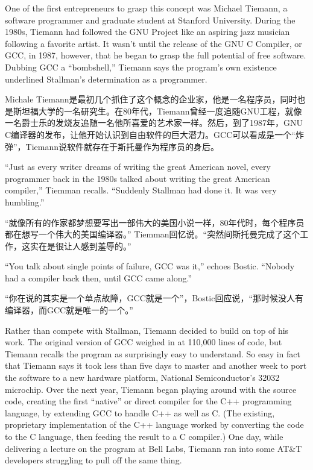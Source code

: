 \ifdefined\eng
One of the first entrepreneurs to grasp this concept was Michael Tiemann, a software programmer and graduate student at Stanford University. During the 1980s, Tiemann had followed the GNU Project like an aspiring jazz musician following a favorite artist. It wasn't until the release of the GNU C Compiler, or GCC, in 1987, however, that he began to grasp the full potential of free software. Dubbing GCC a ``bombshell,'' Tiemann says the program's own existence underlined Stallman's determination as a programmer.
\fi

\ifdefined\chs
Michale Tiemann是最初几个抓住了这个概念的企业家，他是一名程序员，同时也是斯坦福大学的一名研究生。在80年代，Tiemann曾经一度追随GNU工程，就像一名爵士乐的发烧友追随一名他所喜爱的艺术家一样。然后，到了1987年，GNU C编译器的发布，让他开始认识到自由软件的巨大潜力。GCC可以看成是一个“炸弹”，Tiemann说软件就存在于斯托曼作为程序员的身后。
\fi

\ifdefined\eng
``Just as every writer dreams of writing the great American novel, every programmer back in the 1980s talked about writing the great American compiler,'' Tiemman recalls. ``Suddenly Stallman had done it. It was very humbling.''
\fi

\ifdefined\chs
“就像所有的作家都梦想要写出一部伟大的美国小说一样，80年代时，每个程序员都在想写一个伟大的美国编译器。” Tiemman回忆说。“突然间斯托曼完成了这个工作，这实在是很让人感到羞辱的。”
\fi

\ifdefined\eng
``You talk about single points of failure, GCC was it,'' echoes Bostic. ``Nobody had a compiler back then, until GCC came along.''
\fi

\ifdefined\chs
“你在说的其实是一个单点故障，GCC就是一个”，Bostic回应说，“那时候没人有编译器，而GCC就是唯一的一个。”
\fi

\ifdefined\eng
Rather than compete with Stallman, Tiemann decided to build on top of his work. The original version of GCC weighed in at 110,000 lines of code, but Tiemann recalls the program as surprisingly easy to understand. So easy in fact that Tiemann says it took less than five days to master and another week to port the software to a new hardware platform, National Semiconductor's 32032 microchip. Over the next year, Tiemann began playing around with the source code, creating the first ``native'' or direct compiler for the C++ programming language, by extending GCC to handle C++ as well as C. (The existing, proprietary implementation of the C++ language worked by converting the code to the C language, then feeding the result to a C compiler.) One day, while delivering a lecture on the program at Bell Labs, Tiemann ran into some AT\&T developers struggling to pull off the same thing.
\fi

